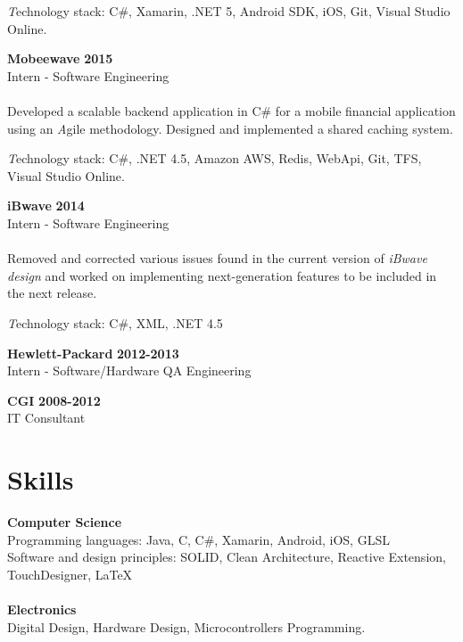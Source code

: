 \documentclass[margin,line]{res}
\begin{document}
\begin{resume}
{\emph Technology stack:} C\#, Xamarin, .NET 5, Android SDK, iOS, Git, Visual Studio Online.


{\bf Mobeewave} \hfill {\bf 2015}\\
Intern - Software Engineering\\\\
Developed a scalable backend application in C\# for a mobile financial application using an {\emph Agile} methodology. Designed and implemented a shared caching system. 

{\emph Technology stack:} C\#, .NET 4.5, Amazon AWS, Redis, WebApi, Git, TFS, Visual Studio Online.


{\bf iBwave} \hfill {\bf 2014}\\
Intern - Software Engineering\\\\
Removed and corrected various issues found in the current version of \emph{iBwave design} and worked on implementing next-generation features to be included in the next release.

{\emph Technology stack:} C\#, XML, .NET 4.5


{\bf Hewlett-Packard} \hfill {\bf 2012-2013}\\
Intern - Software/Hardware QA Engineering 

{\bf CGI} \hfill {\bf 2008-2012}\\
IT Consultant


\section{\sc Skills}

{\bf Computer Science} \\
Programming languages:  Java, C, C\#, Xamarin, Android, iOS, GLSL\\
Software and design principles:  SOLID, Clean Architecture, Reactive Extension, TouchDesigner, \LaTeX \\\\
{\bf Electronics} \\
Digital Design, Hardware Design, Microcontrollers Programming.


\end{resume}
\end{document}
